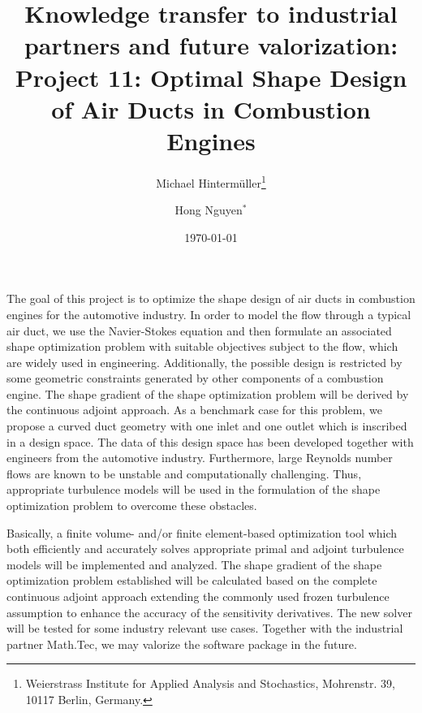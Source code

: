\documentclass{article}
\title{Knowledge transfer to industrial partners and future valorization:\\
Project 11: Optimal Shape Design of Air Ducts in Combustion Engines}
\author{Michael Hinterm\"uller\thanks{Weierstrass Institute for Applied Analysis and Stochastics, Mohrenstr. 39, 10117 Berlin, Germany.} \and Hong Nguyen${}^*$}
\date{\today}
\numberwithin{equation}{section}
\begin{document}
\maketitle

The goal of this project is to optimize the shape design of air ducts in combustion engines for the automotive industry. In order to model the flow through a typical air duct, we use the Navier-Stokes equation and then formulate an associated shape optimization problem with suitable objectives subject to the flow, which are widely used in engineering. Additionally, the possible design is restricted by some geometric constraints generated by other components of a combustion engine. The shape gradient of the shape optimization problem will be derived by the continuous adjoint approach. As a benchmark case for this problem, we propose a curved duct geometry with one inlet and one outlet which is inscribed in a design space. The data of this design space has been developed together with engineers from the automotive industry. Furthermore, large Reynolds number flows are known to be unstable and computationally challenging. Thus, appropriate turbulence models will be used in the formulation of the shape optimization problem to overcome these obstacles.

Basically, a finite volume- and/or finite element-based optimization tool which both efficiently and accurately solves appropriate primal and adjoint turbulence models will be implemented and analyzed. The shape gradient of the shape optimization problem established will be calculated based on the complete continuous adjoint approach extending the commonly used frozen turbulence assumption to enhance the accuracy of the sensitivity derivatives. The new solver will be tested for some industry relevant use cases. Together with the industrial partner Math.Tec, we may valorize the software package in the future.


\printbibliography[heading=bibintoc]
\end{document}
